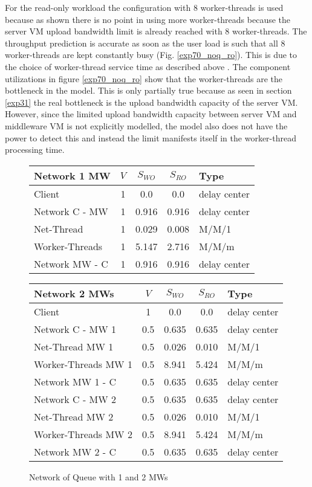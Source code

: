 \documentclass[report.tex]{subfiles}
\begin{document}
For the read-only workload the configuration with 8 worker-threads is used because as shown there is no point in using more worker-threads because the server VM upload bandwidth limit is already reached with 8 worker-threads. The throughput prediction is accurate as soon as the user load is such that all 8 worker-threads are kept constantly busy (Fig. \ref{exp70_noq_ro}). This is due to the choice of worker-thread service time as described above . The component utilizations in figure \ref{exp70_noq_ro} show that the worker-threads are the bottleneck in the model. This is only partially true because as seen in section \ref{exp31} the real bottleneck is the upload bandwidth capacity of the server VM. However, since the limited upload bandwidth capacity between server VM and middleware VM is not explicitly modelled, the model also does not have the power to detect this and instead the limit manifests itself in the worker-thread processing time.


\begin{figure}
	\centering
	\scriptsize{
		\setlength{\tabcolsep}{4.5pt}
		\begin{tabular}{|l|c|c|c|l|}
			\hline 
			\textbf{Network 1 MW} & $V$ & $S_{WO}$ &  $S_{RO}$ &Type \Tstrut\\ 
			\hline 
			Client & 1 & 0.0 & 0.0  & delay center \Tstrut\\ 
			\hline 
			Network C - MW & 1 & 0.916 & 0.916 & delay center \Tstrut\\  
			Net-Thread & 1 & 0.029 & 0.008 & M/M/1 \\ 
			Worker-Threads & 1 & 5.147 & 2.716 & M/M/m  \\ 
			Network MW - C & 1 & 0.916 & 0.916 & delay center \\ 
			\hline 
		\end{tabular} 
		\quad
		\setlength{\tabcolsep}{4.5pt}
		\begin{tabular}{|l|c|c|c|l|}
			\hline 
			\textbf{Network 2 MWs} & $V$ & $S_{WO}$ &  $S_{RO}$ & Type \Tstrut\\ 
			\hline 
			Client & 1 & 0.0 & 0.0 & delay center \Tstrut\\ 
			\hline 
			Network C - MW 1 & 0.5 & 0.635 & 0.635 & delay center \Tstrut\\ 
			Net-Thread MW 1 & 0.5 & 0.026 & 0.010 & M/M/1 \\ 
			Worker-Threads MW 1 & 0.5 & 8.941 & 5.424 & M/M/m  \\ 
			Network MW 1 - C & 0.5 & 0.635 & 0.635 & delay center \\ 
			\hline 
			Network C - MW 2 & 0.5 & 0.635 & 0.635 & delay center \Tstrut\\  
			Net-Thread MW 2 & 0.5 & 0.026 & 0.010 & M/M/1 \\ 
			Worker-Threads MW 2 & 0.5 & 8.941 & 5.424 & M/M/m  \\
			Network MW 2 - C & 0.5 & 0.635 & 0.635 & delay center \\ 
			\hline 
		\end{tabular}
	} 
	\caption{Network of Queue with 1 and 2 MWs}\label{exp70_noq}
\end{figure}
\end{document}
